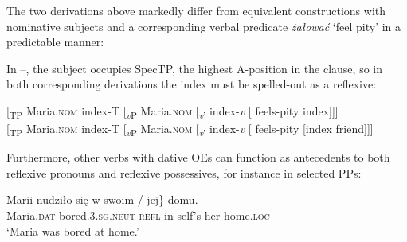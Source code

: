 \documentclass[output=paper,modfonts,nonflat
]{langsci/langscibook}
\begin{document}
\noindent The two derivations above markedly differ from equivalent constructions with nominative subjects and a corresponding verbal predicate \textit{żałować} ‘feel pity’ in a predictable manner:

\ea \label{ex:witkos:36}
	\z
\z
                        
\noindent In --, the subject occupies SpecTP, the highest A-position in the clause, so in both corresponding derivations the index must be spelled-out as a reflexive: 

\ea \label{ex:witkos:37}
	\ea\label{ex:witkos:37a}
    {[\textsubscript{TP} Maria.\textsc{nom} index-T [\textsubscript{\textit{v}P} Maria.\textsc{nom} [\textsubscript{\textit{v}’} index-\textit{v} [ feels-pity index]]]}\\
	\ex \label{ex:witkos:37b}
    {[\textsubscript{TP} Maria.\textsc{nom} index-T [\textsubscript{\textit{v}P} Maria.\textsc{nom} [\textsubscript{\textit{v}’} index-\textit{v} [ feels-pity [index friend]]]}\\
	\z
\z
                
\noindent Furthermore, other verbs with dative OEs can function as antecedents to both reflexive pronouns and reflexive possessives, for instance in selected PPs:

\ea \label{ex:witkos:38}{
\gll Marii nudziło się w \minsp{\{} swoim / jej\} domu.\\
     Maria.\textsc{dat} bored.\textsc{3.sg.neut} \textsc{refl} in {} self’s {} her home.\textsc{loc}\\
\glt `Maria was bored at home.'
}
\z
                
\end{document}
